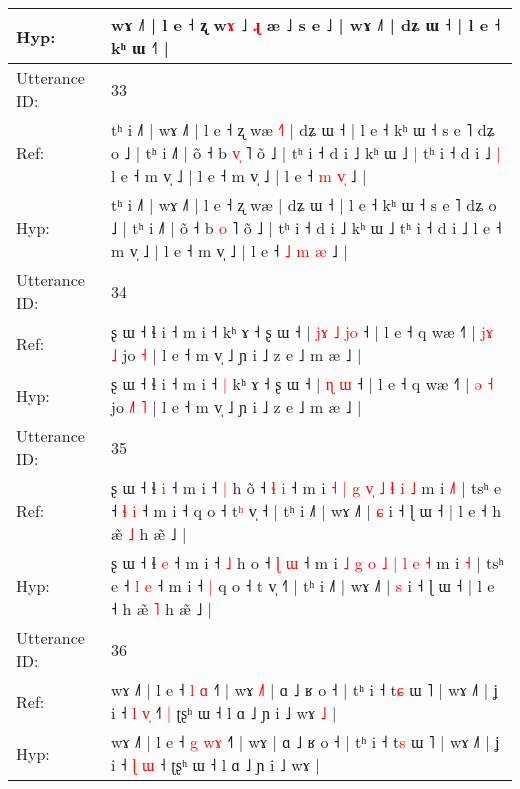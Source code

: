 \documentclass[10pt]{article}
\DeclareRobustCommand{\hl}[1]{{\textcolor{red}{#1}}}
\begin{document}
\begin{longtable}{ll}
 \\
Hyp: & wɤ ˩˥ | l e ˧ ʐ w\hl{ɤ} ˩ \hl{ɻ} \hl{}æ ˩ s e ˩ | wɤ ˩˥ | dʑ ɯ ˧ | l e ˧ kʰ ɯ ˧˥ |
 \\
\midrule
Utterance ID: & 33 \\
Ref: & tʰ i ˩˥ | wɤ ˩˥ | l e ˧ ʐ wæ\hl{ }\hl{˧}\hl{˥} | dʑ ɯ ˧ | l e ˧ kʰ ɯ ˧ s e ˥ dʑ o ˩ | tʰ i ˩˥ | õ ˧ b \hl{v}\hl{̩} ˥ õ ˩ | tʰ i ˧ d i ˩ kʰ ɯ ˩\hl{ }\hl{|} tʰ i ˧ d i ˩\hl{ }\hl{|} l e ˧ m v̩ ˩ | l e ˧ m v̩ ˩ | l e ˧ \hl{m} \hl{}\hl{v}\hl{̩} ˩ |
 \\
Hyp: & tʰ i ˩˥ | wɤ ˩˥ | l e ˧ ʐ wæ\hl{}\hl{}\hl{} | dʑ ɯ ˧ | l e ˧ kʰ ɯ ˧ s e ˥ dʑ o ˩ | tʰ i ˩˥ | õ ˧ b \hl{}\hl{o} ˥ õ ˩ | tʰ i ˧ d i ˩ kʰ ɯ ˩\hl{}\hl{} tʰ i ˧ d i ˩\hl{}\hl{} l e ˧ m v̩ ˩ | l e ˧ m v̩ ˩ | l e ˧ \hl{˩} \hl{m}\hl{ }\hl{æ} ˩ |
 \\
\midrule
Utterance ID: & 34 \\
Ref: & ʂ ɯ ˧ ɬ i ˧ m i ˧\hl{}\hl{} kʰ ɤ ˧ ʂ ɯ ˧ |\hl{ }\hl{j}\hl{ɤ} \hl{˩} \hl{j}\hl{o} ˧ | l e ˧ q wæ ˧˥ | \hl{j}\hl{ɤ} \hl{˩} jo\hl{}\hl{}\hl{} \hl{˧} | l e ˧ m v̩ ˩ ɲ i ˩ z e ˩ m æ ˩ |
 \\
Hyp: & ʂ ɯ ˧ ɬ i ˧ m i ˧\hl{ }\hl{|} kʰ ɤ ˧ ʂ ɯ ˧ |\hl{}\hl{}\hl{} \hl{ɳ} \hl{}\hl{ɯ} ˧ | l e ˧ q wæ ˧˥ | \hl{}\hl{ə} \hl{˧} jo\hl{ }\hl{˩}\hl{˥} \hl{˥} | l e ˧ m v̩ ˩ ɲ i ˩ z e ˩ m æ ˩ |
 \\
\midrule
Utterance ID: & 35 \\
Ref: & ʂ ɯ ˧ ɬ \hl{i} ˧ m i ˧ \hl{|} h o\hl{̃} ˧ \hl{ɬ} \hl{i} ˧ m i \hl{˧} \hl{|} \hl{g} \hl{v}\hl{̩} \hl{˩} \hl{ɬ} \hl{i} \hl{˩} m i \hl{˩}\hl{˥} | tsʰ e ˧ \hl{ɬ} \hl{i} ˧ m i ˧\hl{}\hl{} q o ˧ t\hl{ʰ} v̩ ˧\hl{} | tʰ i ˩˥ | wɤ ˩˥ | \hl{ɕ} i ˧ ɭ ɯ ˧ | l e ˧ h æ̃ \hl{˩} h æ̃ ˩ |
 \\
Hyp: & ʂ ɯ ˧ ɬ \hl{e} ˧ m i ˧ \hl{˩} h o\hl{} ˧ \hl{ɭ} \hl{ɯ} ˧ m i \hl{˩} \hl{g} \hl{o} \hl{}\hl{˩} \hl{|} \hl{l} \hl{e} \hl{˧} m i \hl{}\hl{˧} | tsʰ e ˧ \hl{l} \hl{e} ˧ m i ˧\hl{ }\hl{|} q o ˧ t\hl{} v̩ ˧\hl{˥} | tʰ i ˩˥ | wɤ ˩˥ | \hl{s} i ˧ ɭ ɯ ˧ | l e ˧ h æ̃ \hl{˥} h æ̃ ˩ |
 \\
\midrule
Utterance ID: & 36 \\
Ref: & wɤ ˩˥ | l e ˧ \hl{l} \hl{}\hl{ɑ} ˧˥ | wɤ\hl{ }\hl{˩}\hl{˥} | ɑ ˩ ʁ o ˧ | tʰ i ˧ t\hl{ɕ} ɯ ˥ | wɤ ˩˥ | ʝ i ˧ \hl{l} \hl{v}\hl{̩} ˧\hl{˥}\hl{ }\hl{|} ʈʂʰ ɯ ˧ l ɑ ˩ ɲ i ˩ wɤ\hl{ }\hl{˩} |
 \\
Hyp: & wɤ ˩˥ | l e ˧ \hl{g} \hl{w}\hl{ɤ} ˧˥ | wɤ\hl{}\hl{}\hl{} | ɑ ˩ ʁ o ˧ | tʰ i ˧ t\hl{s} ɯ ˥ | wɤ ˩˥ | ʝ i ˧ \hl{ɭ} \hl{}\hl{ɯ} ˧\hl{}\hl{}\hl{} ʈʂʰ ɯ ˧ l ɑ ˩ ɲ i ˩ wɤ\hl{}\hl{} |
 \\

\end{longtable}
\end{document}
